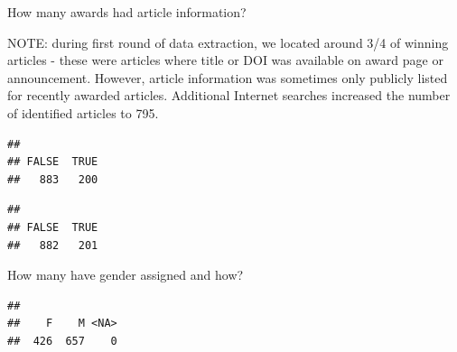 \documentclass[
]{article}
\newenvironment{Shaded}{\begin{snugshade}}{\end{snugshade}}
\newcommand{\AttributeTok}[1]{\textcolor[rgb]{0.77,0.63,0.00}{#1}}
\newcommand{\CommentTok}[1]{\textcolor[rgb]{0.56,0.35,0.01}{\textit{#1}}}
\newcommand{\DecValTok}[1]{\textcolor[rgb]{0.00,0.00,0.81}{#1}}
\newcommand{\FunctionTok}[1]{\textcolor[rgb]{0.00,0.00,0.00}{#1}}
\newcommand{\NormalTok}[1]{#1}
\newcommand{\SpecialCharTok}[1]{\textcolor[rgb]{0.00,0.00,0.00}{#1}}
\newcommand{\StringTok}[1]{\textcolor[rgb]{0.31,0.60,0.02}{#1}}
\begin{document}
How many awards had article information?

NOTE: during first round of data extraction, we located around 3/4 of
winning articles - these were articles where title or DOI was available
on award page or announcement. However, article information was
sometimes only publicly listed for recently awarded articles. Additional
Internet searches increased the number of identified articles to 795.

\begin{Shaded}
\end{Shaded}

\begin{verbatim}
## 
## FALSE  TRUE 
##   883   200
\end{verbatim}

\begin{Shaded}
\end{Shaded}

\begin{verbatim}
## 
## FALSE  TRUE 
##   882   201
\end{verbatim}

How many have gender assigned and how?

\begin{Shaded}
\end{Shaded}

\begin{verbatim}
## 
##    F    M <NA> 
##  426  657    0
\end{verbatim}

\begin{Shaded}
\end{Shaded}
\end{document}
